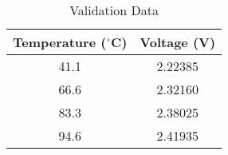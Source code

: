 \documentclass{article}
\begin{document}

\begin{table}[h]
\centering
\caption{Validation Data}
\label{tab:validation_data}
\begin{tabular}{|c|c|}
\hline
\textbf{Temperature ($^{\circ}$C)} & \textbf{Voltage (V)} \\
\hline
41.1 & 2.22385 \\
\hline
66.6 & 2.32160 \\
\hline
83.3 & 2.38025 \\
\hline
94.6 & 2.41935 \\
\hline
\end{tabular}
\end{table}
\end{document}
